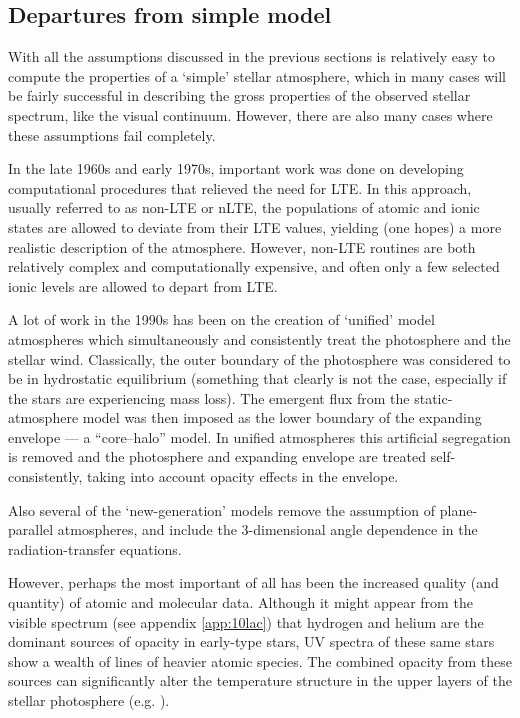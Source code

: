 \subsection{Departures from simple model}

With all the assumptions discussed in the previous sections is
relatively easy to compute the properties of a `simple' stellar
atmosphere, which in many cases will be fairly successful in
describing the gross properties of the observed stellar spectrum, like
the visual continuum. However, there are also many cases where these
assumptions fail completely.

In the late 1960s and early 1970s, important work was done on
developing computational procedures that relieved the need for
LTE. In this approach, usually referred to as non-LTE or nLTE, the
populations of atomic and ionic states are allowed to deviate from
their LTE values, yielding (one hopes) a more realistic description of
the atmosphere. However, non-LTE routines are both relatively complex and
computationally expensive, and often only a few selected ionic
levels are allowed to depart from LTE.

A lot of work in the 1990s has been on the creation of `unified' model
atmospheres which simultaneously and consistently treat the
photosphere and the stellar wind. Classically, the outer boundary of
the photosphere was considered to be in hydrostatic equilibrium
(something that clearly is not the case, especially if the stars are
experiencing mass loss). The emergent flux from the static-atmosphere
model was then imposed as the lower boundary of the expanding envelope
--- a ``core--halo'' model. In unified atmospheres this artificial
segregation is removed and the photosphere and expanding envelope are
treated self-consistently, taking into account opacity effects in the
envelope.

Also several of the `new-generation' models remove the assumption of
plane-parallel atmospheres, and include the 3-dimensional angle
dependence in the radiation-transfer equations.

However, perhaps the most important of all has been the
increased quality (and quantity) of atomic and molecular
data. Although it might appear from the visible spectrum (see
appendix \ref{app:10lac}) that hydrogen and helium are the dominant
sources of opacity in early-type stars, UV spectra of these same stars
show a wealth of lines of heavier atomic species. The combined
opacity from these sources can significantly alter the temperature
structure in the upper layers of the stellar photosphere (e.g. \cite{hu:98}).

